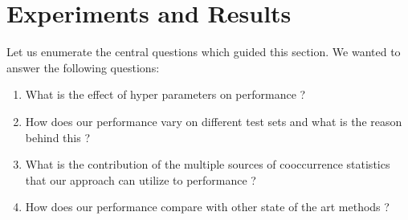 \documentclass[11pt]{article}
\begin{document}
\begin{table}[htbp]
  \begin{adjustwidth}{0cm}{}
  \caption{List of test datasets used with their acronyms, and total
    number of data points. The first 10 datasets contain human
    judgements of annotations and we will report Spearman correlation
    of  the human ratings with similarity between the word
    representations which is a popular metric in the community.
    TOMAS-SYN and TOMAS-SEM are open vocabulary tasks and we will report accuracies on
  those tasks with the full vocabulary. Also note that for the RW
  dataset our recall was 85\%.}
  \label{tab:testlist}
   \end{adjustwidth}
\end{table}

\section{Experiments and Results}
\label{sec:exp}
Let us enumerate the central questions which guided this section. We
wanted to answer the following questions:
\begin{enumerate}
\item What is the effect of hyper parameters on performance ?
\item How does our performance vary on different test sets and what is
  the reason behind this ?
\item What is the contribution of the multiple sources of cooccurrence
  statistics that our approach can utilize to performance ?
\item How does our performance compare with other state of the art
  methods ?
\end{enumerate}
\end{document}
